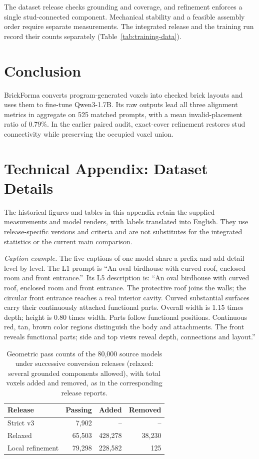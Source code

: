 \documentclass[letterpaper]{article} %
\begin{document}
The dataset release checks grounding and coverage, and refinement enforces a single stud-connected component. Mechanical stability and a feasible assembly order require separate measurements. The integrated release and the training run record their counts separately (Table~\ref{tab:training-data}).

\section{Conclusion}
BrickForma converts program-generated voxels into checked brick layouts and uses them to fine-tune Qwen3-1.7B. Its raw outputs lead all three alignment metrics in aggregate on 525 matched prompts, with a mean invalid-placement ratio of 0.79\%. In the earlier paired audit, exact-cover refinement restores stud connectivity while preserving the occupied voxel union.


\FloatBarrier
\appendix
\section{Technical Appendix: Dataset Details}
\label{app:dataset}
The historical figures and tables in this appendix retain the supplied measurements and model renders, with labels translated into English. They use release-specific versions and criteria and are not substitutes for the integrated statistics or the current main comparison.

\emph{Caption example.} The five captions of one model share a prefix and add detail level by level. The L1 prompt is \textquotedblleft An oval birdhouse with curved roof, enclosed room and front entrance.\textquotedblright\ Its L5 description is: ``An oval birdhouse with curved roof, enclosed room and front entrance. The protective roof joins the walls; the circular front entrance reaches a real interior cavity. Curved substantial surfaces carry their continuously attached functional parts. Overall width is 1.15 times depth; height is 0.80 times width. Parts follow functional positions. Continuous red, tan, brown color regions distinguish the body and attachments. The front reveals functional parts; side and top views reveal depth, connections and layout.''

\begin{table}[!htbp]
\centering
\small
\setlength{\tabcolsep}{3pt}
\begin{tabular}{lrrr}
\toprule
Release & Passing & Added & Removed \\
\midrule
Strict v3 & 7,902 & -- & -- \\
Relaxed & 65,503 & 428,278 & 38,230 \\
Local refinement & 79,298 & 228,582 & 125 \\ %
\bottomrule
\end{tabular}
\caption{Geometric pass counts of the 80,000 source models under successive conversion releases (relaxed: several grounded components allowed), with total voxels added and removed, as in the corresponding release reports.}
\label{tab:conversion}
\end{table}
\end{document}
